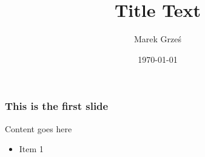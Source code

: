 \documentclass{beamer}
\title[]{Title Text}
\author[Marek Grze\'{s}]{Marek Grze\'{s}}
\institute{\texttt{[image: uow]}}
\date{{\tiny\today}}
\begin{document}
  \begin{frame}
    \titlepage
  \end{frame}

  \begin{frame}
    \frametitle{This is the first slide}
    Content goes here
    \begin{itemize}
      \item Item 1
    \end{itemize}

  \end{frame}
\end{document}
